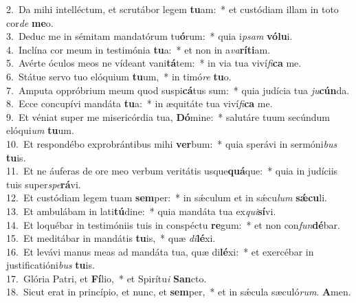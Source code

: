 {2.~}Da mihi intelléctum, et scrutábor legem \textbf{tu}am:~* et custódiam illam in toto cor\textit{de} \textbf{me}o.\\
{3.~}Deduc me in sémitam mandatórum tu\textbf{ó}rum:~* quia i\textit{psam} \textbf{vó}\textbf{lu}i.\\
{4.~}Inclína cor meum in testimónia \textbf{tu}a:~* et non in a\textit{va}\textbf{rí}\textbf{ti}am.\\
{5.~}Avérte óculos meos ne vídeant vani\textbf{tá}tem:~* in via tua viví\textit{fi}\textbf{ca} me.\\
{6.~}Státue servo tuo elóquium \textbf{tu}um,~* in timó\textit{re} \textbf{tu}o.\\
{7.~}Amputa oppróbrium meum quod suspi\textbf{cá}tus sum:~* quia judícia tua \textit{ju}\textbf{cún}da.\\
{8.~}Ecce concupívi mandáta \textbf{tu}a:~* in æquitáte tua viví\textit{fi}\textbf{ca} me.\\
{9.~}Et véniat super me misericórdia tua, \textbf{Dó}mine:~* salutáre tuum secúndum elóqui\textit{um} \textbf{tu}um.\\
{10.~}Et respondébo exprobrántibus mihi \textbf{ver}bum:~* quia sperávi in sermóni\textit{bus} \textbf{tu}is.\\
{11.~}Et ne áuferas de ore meo verbum veritátis usque\textbf{quá}que:~* quia in judíciis tuis super\textit{spe}\textbf{rá}vi.\\
{12.~}Et custódiam legem tuam \textbf{sem}per:~* in sǽculum et in sǽcu\textit{lum} \textbf{sǽ}\textbf{cu}li.\\
{13.~}Et ambulábam in lati\textbf{tú}dine:~* quia mandáta tua ex\textit{qui}\textbf{sí}vi.\\
{14.~}Et loquébar in testimóniis tuis in conspéctu \textbf{re}gum:~* et non con\textit{fun}\textbf{dé}bar.\\
{15.~}Et meditábar in mandátis \textbf{tu}is,~* quæ \textit{di}\textbf{lé}xi.\\
{16.~}Et levávi manus meas ad mandáta tua, quæ di\textbf{lé}xi:~* et exercébar in justificatióni\textit{bus} \textbf{tu}is.\\
{17.~}Glória Patri, et \textbf{Fí}lio,~* et Spirítu\textit{i} \textbf{San}cto.\\
{18.~}Sicut erat in princípio, et nunc, et \textbf{sem}per,~* et in sǽcula sæculó\textit{rum}. \textbf{A}men.\\
